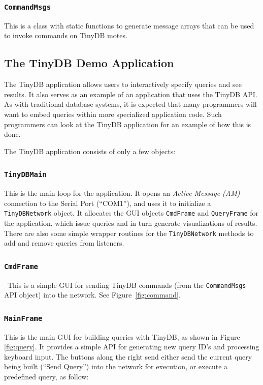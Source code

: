 \documentclass[11pt]{article}
\begin{document}
\subsubsection{\tt CommandMsgs} This is a class with static functions to
    generate message arrays that can be used to invoke commands on TinyDB
    motes.

\subsection{The TinyDB Demo Application}
\label{sec:app}
The TinyDB application allows users to interactively specify queries
and see results.  It also serves as an example of an application that
uses the TinyDB API.  As with traditional database systems, it is
expected that many programmers will want to embed queries within more
specialized application code.  Such programmers can look at the TinyDB
application for an example of how this is done.

The TinyDB application consists of only a few objects:
\subsubsection{\tt TinyDBMain}
\label{sec:tinydbmain}
This is the main loop for the application.  It
  opens an {\em Active Message (AM)} connection to
  the Serial Port (``COM1''), and uses it to initialize a {\tt
  TinyDBNetwork} object.  It
  allocates the GUI objects {\tt CmdFrame} and {\tt QueryFrame} for
  the application, which issue queries and in turn generate visualizations
  of results.  There are also some simple wrapper routines for
  the {\tt TinyDBNetwork} methods to add and remove queries from listeners.


\subsubsection{\tt CmdFrame}\
This is a simple GUI for sending TinyDB commands
  (from the {\tt CommandMsgs} API\index{API} object) into the network.  See Figure~\ref{fig:command}.

\subsubsection{\tt MainFrame}\label{sec:cmdframe}\label{sec:queryframe}
This is the main GUI\index{GUI} for building queries with TinyDB, as shown in Figure \ref{fig:query}.  
It provides a simple API for generating new query ID's and processing keyboard input.  The buttons along
the right send either send the current query being built (``Send Query'') into the network for
execution, or execute a predefined query, as follow:
\end{document}
